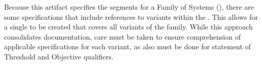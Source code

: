 
Because this artifact specifies the segments for a Family of Systems (\FoS), there are some specifications that include references to variants within the \FoS.
This allows for a single \SSS to be created that covers all variants of the family.
While this approach consolidates documentation, care must be taken to ensure comprehension of applicable specifications for each variant, as also must be done for statement of Threshold and Objective qualifiers. 